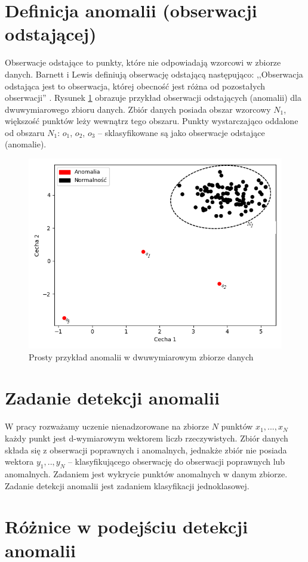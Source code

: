 \section{Definicja anomalii (obserwacji odstającej)}
Obserwacje odstające to punkty, które nie odpowiadają wzorcowi w zbiorze danych. Barnett i Lewis definiują obserwację odstającą następująco: ,,Obserwacja odstająca jest to obserwacja, której obecność jest różna od pozostałych obserwacji'' \cite{barnett1984outliers}. Rysunek \ref{fig:anomalia} obrazuje przykład obserwacji odstających (anomalii) dla dwuwymiarowego zbioru danych. Zbiór danych posiada obszar wzorcowy {$N_1$}, większość punktów leży wewnątrz tego obszaru. Punkty wystarczająco oddalone od obszaru $N_1$: $o_1$, $o_2$, $o_3$ -- sklasyfikowane są jako obserwacje odstające (anomalie).
\begin{figure}
    \centering
    \includegraphics[width=.5\textwidth]{chapters/istniejace/images/anomalia.png}
    \caption{Prosty przykład anomalii w dwuwymiarowym zbiorze danych}
    \label{fig:anomalia}
\end{figure}

\section{Zadanie detekcji anomalii}
W pracy rozważamy uczenie nienadzorowane na zbiorze $N$ punktów $x_1,...,x_N$ każdy punkt jest d-wymiarowym wektorem liczb rzeczywistych. Zbiór danych składa się z obserwacji poprawnych i anomalnych, jednakże zbiór nie posiada wektora $y_1,..,y_N$ -- klasyfikującego obserwację do obserwacji poprawnych lub anomalnych. Zadaniem jest wykrycie punktów anomalnych w danym zbiorze. Zadanie detekcji anomalii jest zadaniem klasyfikacji jednoklasowej. 

\section{Różnice w podejściu detekcji anomalii}


